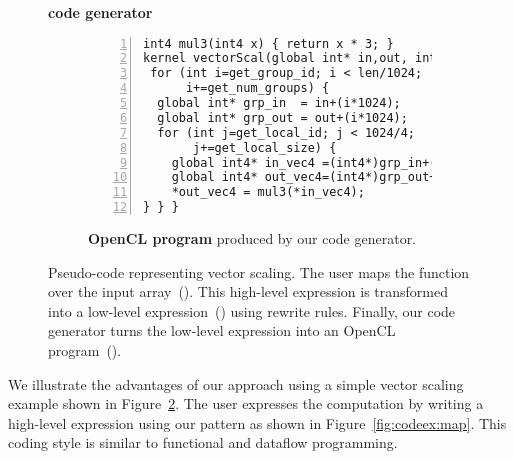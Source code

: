 \begin{figure}[t]
\vspace{-5pt}
\begin{minipage}{0.1\linewidth}
\vspace{0pt}
\centering
{}
\end{minipage}
\begin{minipage}{0.26\linewidth}
\vspace{-5pt}
\centering
\textbf{code generator}
\end{minipage}
\begin{minipage}{0.1\linewidth}
\vspace{0pt}
\centering
{}
\end{minipage}

\vspace{0pt}
\begin{subfigure}[b]{\linewidth}
\centering
\begin{minipage}{.85\textwidth}
\begin{lstlisting}[mathescape,numbers=left]
int4 mul3(int4 x) { return x * 3; }
kernel vectorScal(global int* in,out, int len){
 for (int i=get_group_id; i < len/1024;
      i+=get_num_groups) {
  global int* grp_in  = in+(i*1024);
  global int* grp_out = out+(i*1024);
  for (int j=get_local_id; j < 1024/4;
       j+=get_local_size) {
    global int4* in_vec4 =(int4*)grp_in+(j*4);
    global int4* out_vec4=(int4*)grp_out+(j*4);
    *out_vec4 = mul3(*in_vec4);      
} } }  
\end{lstlisting}
\end{minipage}
\caption{\textbf{OpenCL program} produced by our code generator.}
\label{fig:codeex:ocl}
\end{subfigure}
\vspace{-25pt}
\caption{
Pseudo-code representing vector scaling.
The user maps the  function over the input array~().
This high-level expression is transformed into a low-level expression~() using rewrite rules.
Finally, our code generator turns the low-level expression into an OpenCL program~().
}
  \label{fig:codeex}
\end{figure}

We illustrate the advantages of our approach using a simple vector scaling example shown in Figure~\ref{fig:codeex}.
The user expresses the computation by writing a high-level expression using our  pattern as shown in Figure~\ref{fig:codeex:map}.
This coding style is similar to functional and dataflow programming.

